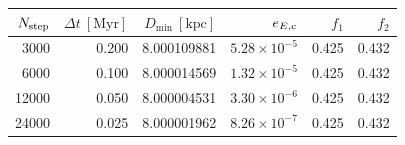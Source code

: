 \begin{tabular}{rrrrrr}\toprule
$N_{\rm step}$ & $\Delta t\ [\mathrm{Myr}]$ & $D_{\min}\ [\mathrm{kpc}]$ & $e_{E,{\rm c}}$ & $f_1$ & $f_2$ \\
\midrule
3000 & 0.200 & 8.000109881 & $5.28\times 10^{-5}$ & 0.425 & 0.432 \\
6000 & 0.100 & 8.000014569 & $1.32\times 10^{-5}$ & 0.425 & 0.432 \\
12000 & 0.050 & 8.000004531 & $3.30\times 10^{-6}$ & 0.425 & 0.432 \\
24000 & 0.025 & 8.000001962 & $8.26\times 10^{-7}$ & 0.425 & 0.432 \\
\bottomrule\end{tabular}
